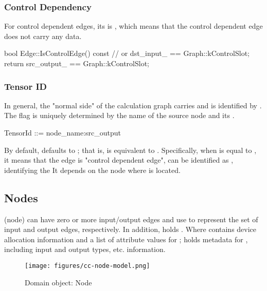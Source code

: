 \begin{content}
\subsubsection{Control Dependency}
For control dependent edges, its  is , which means that the control dependent edge does not carry any data.

\begin{leftbar}
\begin{c++}
bool Edge::IsControlEdge() const {
   // or dst\_input\_ == Graph::kControlSlot;
   return src_output_ == Graph::kControlSlot;
}
\end{c++}
\end{leftbar}


\subsubsection{Tensor ID}
In general, the "normal side" of the calculation graph carries  and is identified by . The  flag is uniquely determined by the name of the source node and its .

\begin{leftbar}
\begin{c++}
TensorId ::= node_name:src_output
\end{c++}
\end{leftbar}

By default,  defaults to ; that is,  is equivalent to . Specifically, when  is equal to , it means that the edge is "control dependent edge",  can be identified as , identifying the It depends on the node where  is located.


\subsection{Nodes}
 (node) can have zero or more input/output edges and use  to represent the set of input and output edges, respectively. In addition,  holds . Where  contains device allocation information and a list of attribute values ​​for ;  holds metadata for , including  input and output types, etc. information.

\begin{figure}[H]
  \centering
  \texttt{[image: figures/cc-node-model.png]}
  \caption{Domain object: Node}
  \label{fig:cc-node-model}
\end{figure}



\end{content}
